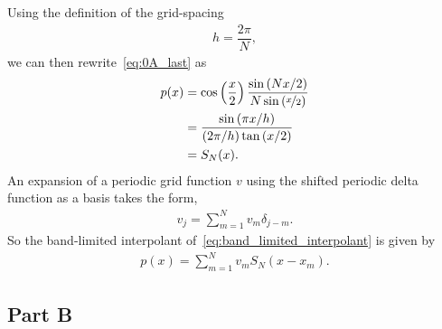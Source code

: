 \documentclass[12pt]{article}
\begin{document}
Using the definition of the grid-spacing
\begin{align}
	h = \dfrac{2\pi}{N},
\end{align}
we can then rewrite~\eqref{eq:0A_last} as
\begin{subequations}
	\begin{align}
	p(x) &= \cos\left(\dfrac{x}{2}\right)\dfrac{\sin\left(Nx/2\right)}{N\sin\left(\nicefrac{x}{2}\right)}\\
	&= \dfrac{\sin\left(\pi x/h\right)}{\left(2\pi/h\right)\tan\left(x/2\right)}\\
	&= S_{N}(x).
	\end{align}
\end{subequations}
An expansion of a periodic grid function $v$ using the shifted periodic delta function as a basis takes the form, 
\begin{align}
	v_{j} = \sum\limits_{m=1}^{N} v_{m}\delta_{j-m}.
\end{align}
So the band-limited interpolant of~\eqref{eq:band_limited_interpolant} is given by 
\begin{align}
	p(x) = \sum\limits_{m=1}^{N} v_{m}S_{N}(x-x_{m}).
\end{align}

\subsection*{Part B}
\end{document}
